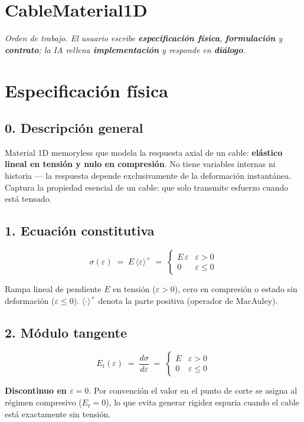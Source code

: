 \documentclass[11pt,letterpaper,oneside]{report}
\begin{document}
\section{CableMaterial1D}



\textit{Orden de trabajo. El usuario escribe \textbf{especificación física}, \textbf{formulación} y \textbf{contrato}; la IA rellena \textbf{implementación} y responde en \textbf{diálogo}.}



\section{Especificación física}

\subsection{0. Descripción general}
Material 1D memoryless que modela la respuesta axial de un cable: \textbf{elástico lineal en tensión y nulo en compresión}. No tiene variables internas ni historia --- la respuesta depende exclusivamente de la deformación instantánea. Captura la propiedad esencial de un cable: que solo transmite esfuerzo cuando está tensado.

\subsection{1. Ecuación constitutiva}
\[
\sigma(\varepsilon) \;=\; E\,\langle\varepsilon\rangle^+ \;=\; \begin{cases} E\,\varepsilon & \varepsilon > 0 \\ 0 & \varepsilon \leq 0 \end{cases}
\]

Rampa lineal de pendiente $E$ en tensión ($\varepsilon > 0$), cero en compresión o estado sin deformación ($\varepsilon \leq 0$). $\langle\cdot\rangle^+$ denota la parte positiva (operador de MacAuley).

\subsection{2. Módulo tangente}
\[
E_t(\varepsilon) \;=\; \frac{d\sigma}{d\varepsilon} \;=\; \begin{cases} E & \varepsilon > 0 \\ 0 & \varepsilon \leq 0 \end{cases}
\]

\textbf{Discontinuo en $\varepsilon = 0$}. Por convención el valor en el punto de corte se asigna al régimen compresivo ($E_t = 0$), lo que evita generar rigidez espuria cuando el cable está exactamente sin tensión.
\end{document}
